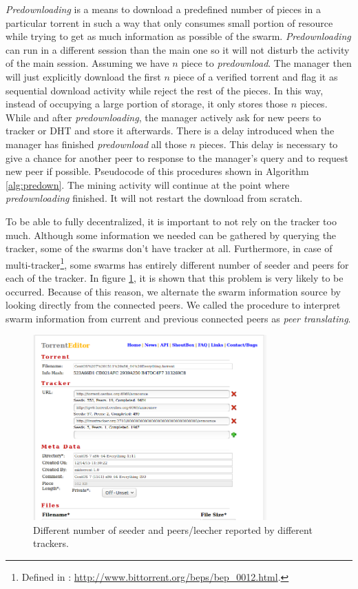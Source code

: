 \textit{Predownloading} is a means to download a predefined number of pieces in a particular torrent in such a way that only consumes small portion of resource while trying to get as much information as possible of the swarm. \textit{Predownloading} can run in a different session than the main one so it will not disturb the activity of the main session. Assuming we have $n$ piece to \textit{predownload}. The manager then will just explicitly download the first $n$ piece of a verified torrent and flag it as sequential download activity while reject the rest of the pieces. In this way, instead of occupying a large portion of storage, it only stores those $n$ pieces. While and after \textit{predownloading}, the manager actively ask for new peers to tracker or DHT and store it afterwards. There is a delay introduced when the manager has finished \textit{predownload} all those $n$ pieces. This delay is necessary to give a chance for another peer to response to the manager's query and to request new peer if possible. Pseudocode of this procedures shown in Algorithm \ref{alg:predown}. The mining activity will continue at the point where \textit{predownloading} finished. It will not restart the download from scratch.

To be able to fully decentralized, it is important to not rely on the tracker too much. Although some information we needed can be gathered by querying the tracker, some of the swarms don't have tracker at all. Furthermore, in case of multi-tracker\footnote{Defined in : \url{http://www.bittorrent.org/beps/bep_0012.html}.}, some swarms has entirely different number of seeder and peers for each of the tracker. In figure \ref{fig:diffsr}, it is shown that this problem is very likely to be occurred. Because of this reason, we alternate the swarm information source by looking directly from the connected peers. We called the procedure to interpret swarm information from current and previous connected peers as \textit{peer translating}. 

\begin{figure}[ht]
	\centering
	\includegraphics[width=0.8\textwidth]{pics/diffsr.png}
	\caption{Different number of seeder and peers/leecher reported by different trackers.}
	\label{fig:diffsr}
\end{figure}

